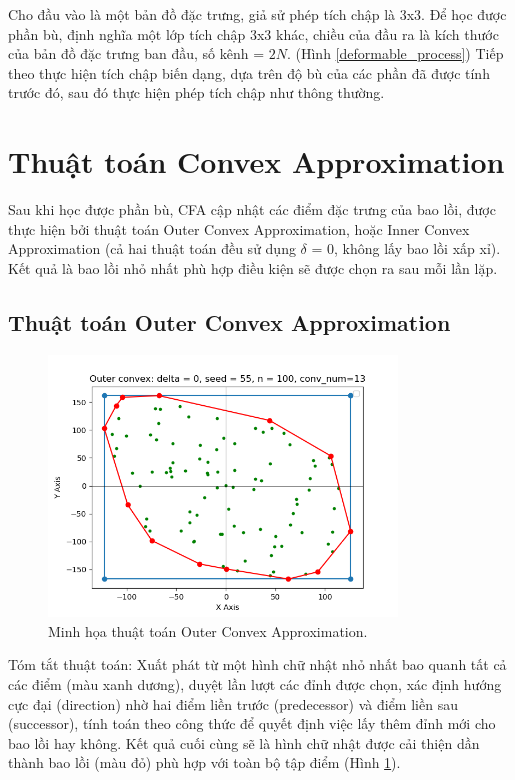 \documentclass[12pt,a4paper,openany,oneside]{report}
\begin{document}
Cho đầu vào là một bản đồ đặc trưng, giả sử phép tích chập là 3x3. Để học được phần bù, định nghĩa một lớp tích chập 3x3 khác, chiều của đầu ra là kích thước của bản đồ đặc trưng ban đầu, số kênh = $2N$. (Hình \ref{deformable_process}) Tiếp theo thực hiện tích chập biến dạng, dựa trên độ bù của các phần đã được tính trước đó, sau đó thực hiện phép tích chập như thông thường.
\section{Thuật toán Convex Approximation}
Sau khi học được phần bù, CFA cập nhật các điểm đặc trưng của bao lồi, được thực hiện bởi thuật toán Outer Convex Approximation, hoặc Inner Convex Approximation (cả hai thuật toán đều sử dụng $\delta$ = 0, không lấy bao lồi xấp xỉ). Kết quả là bao lồi nhỏ nhất phù hợp điều kiện sẽ được chọn ra sau mỗi lần lặp.
\subsection{Thuật toán Outer Convex Approximation}
\begin{figure}[ht!]
	\begin{center}
		\includegraphics[width=350px]{./outer_convex_approximation_brief.png}
		\caption{Minh họa thuật toán Outer Convex Approximation.}
		\label{outer_convex_approximation_brief}
	\end{center}
\end{figure} 
Tóm tắt thuật toán: Xuất phát từ một hình chữ nhật nhỏ nhất bao quanh tất cả các điểm (màu xanh dương), duyệt lần lượt các đỉnh được chọn, xác định hướng cực đại (direction) nhờ hai điểm liền trước (predecessor) và điểm liền sau (successor), tính toán theo công thức để quyết định việc lấy thêm đỉnh mới cho bao lồi hay không. Kết quả cuối cùng sẽ là hình chữ nhật được cải thiện dần thành bao lồi (màu đỏ) phù hợp với toàn bộ tập điểm (Hình \ref{outer_convex_approximation_brief}). 
\end{document}
